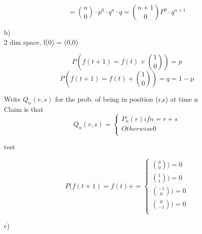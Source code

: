 \documentclass[a4paper,10pt,titlepage]{report}
\begin{document}
\begin{equation}
 = \binom{n}{0} \cdot p^0 \cdot q^n \cdot q = \binom{n+1}{0} P^0 \cdot q^{n+1}
\end{equation}
\vspace{5mm}


b) \\
2 dim space, f(0) = (0,0)

\begin{equation}
P(f(t+1)=f(t)+\binom{1}{0} ) = p
\end{equation}
\begin{equation}
P(f(t+1)=f(t)+\binom{1}{0}) = q = 1-p
\end{equation}

Write $Q_n(r,s) $ for the prob. of being in position (r,s) at time n \\

Claim is that\\
\[
    Q_n(r,s)=\left\{
                \begin{array}{ll}
                  P_n(r) if n = r+s\\
                  Otherwise 0\\
                \end{array}
              \right.
  \]
  
  test
  
  \[
    P(f(t+1)=f(t)+=\left\{
                \begin{array}{ll}
                  \binom{0}{0} ) = 0\\
                  \binom{1}{1} ) = 0\\
                  \binom{-1}{0})= 0 \\
                  \binom{0}{-1})= 0 \\
                \end{array}
              \right.
  \]
  
  

c) \\
\end{document}
